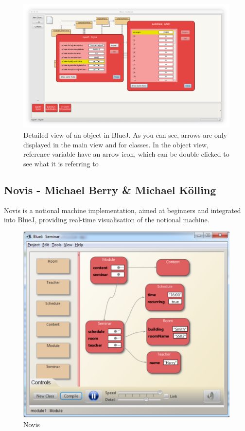 \documentclass[]{usiinfbachelorproject}
\begin{document}
\begin{figure}[h!]
\centering
\includegraphics[width=\textwidth]{figures/bluej_objects_open.png}
\caption {Detailed view of an object in BlueJ. As you can see, arrows are only displayed in the main view and for classes. In the object view, reference variable have an arrow icon, which can be double clicked to see what it is referring to}
\label {bluej_objects_open}
\end{figure}

\subsection{Novis - Michael Berry \& Michael K\"{o}lling}

Novis \cite{7743153} is a notional machine implementation, aimed at beginners and integrated into BlueJ, providing real-time visualisation of the notional machine.

\begin{figure}[h!]
\centering
\includegraphics[scale=0.4]{figures/Novis.png}
\caption {Novis}
\end{figure}
\end{document}
